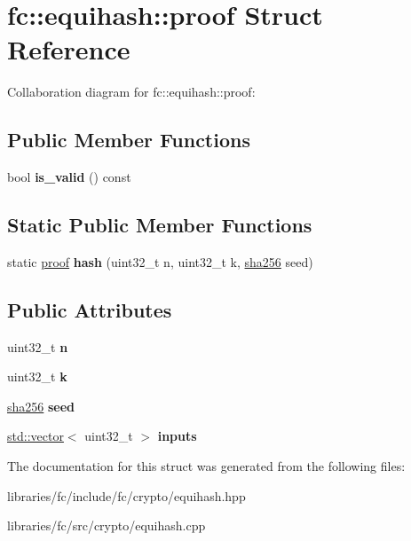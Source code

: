 \hypertarget{structfc_1_1equihash_1_1proof}{}\section{fc\+:\+:equihash\+:\+:proof Struct Reference}
\label{structfc_1_1equihash_1_1proof}


Collaboration diagram for fc\+:\+:equihash\+:\+:proof\+:
\subsection*{Public Member Functions}
\begin{DoxyCompactItemize}
\item 
\mbox{\label{structfc_1_1equihash_1_1proof_a8daeca324fe1aea4c22e22a8299e2f81}} 
bool {\bfseries is\+\_\+valid} () const
\end{DoxyCompactItemize}
\subsection*{Static Public Member Functions}
\begin{DoxyCompactItemize}
\item 
\mbox{\label{structfc_1_1equihash_1_1proof_aa53a9449b0f48ad101ded88ab416b240}} 
static \mbox{\hyperlink{structfc_1_1equihash_1_1proof}{proof}} {\bfseries hash} (uint32\+\_\+t n, uint32\+\_\+t k, \mbox{\hyperlink{classfc_1_1sha256}{sha256}} seed)
\end{DoxyCompactItemize}
\subsection*{Public Attributes}
\begin{DoxyCompactItemize}
\item 
\mbox{\label{structfc_1_1equihash_1_1proof_a57d885177434e8e515a6a8da6879ff87}} 
uint32\+\_\+t {\bfseries n}
\item 
\mbox{\label{structfc_1_1equihash_1_1proof_a60beca9abc2d09c8824fbc2e69c9550a}} 
uint32\+\_\+t {\bfseries k}
\item 
\mbox{\label{structfc_1_1equihash_1_1proof_aa59e4c2a6282ec844270c9ef13403ec5}} 
\mbox{\hyperlink{classfc_1_1sha256}{sha256}} {\bfseries seed}
\item 
\mbox{\label{structfc_1_1equihash_1_1proof_a8321147962f1a92de2e1ea494f2cda28}} 
\mbox{\hyperlink{classstd_1_1vector}{std\+::vector}}$<$ uint32\+\_\+t $>$ {\bfseries inputs}
\end{DoxyCompactItemize}


The documentation for this struct was generated from the following files\+:\begin{DoxyCompactItemize}
\item 
libraries/fc/include/fc/crypto/equihash.\+hpp\item 
libraries/fc/src/crypto/equihash.\+cpp\end{DoxyCompactItemize}

